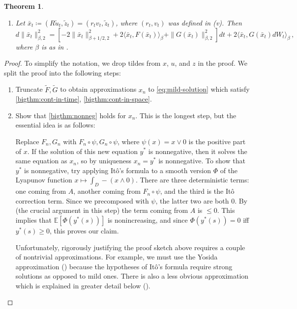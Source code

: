 \documentclass[final]{amsart}
\newtheorem{thm}{Theorem}
\numberwithin{thm}{section}
\numberwithin{equation}{section}
\newcommand{\E}{\mathbb{E}}
\newcommand{\ip}[2]{\langle #1, #2 \rangle}
\begin{document}
\begin{thm}
\begin{enumerate}[label=(\roman*)]
    \item \label{bigthm:dbeta} Let $\bar{x}_t \coloneqq (R\tilde{u}_t, \tilde{z}_t) = (r_tv_t,\tilde{z}_t)$, where $(r_t, v_t)$ was defined in (v). Then
    \begin{equation}\label{eq:dbeta-x-tilde}
        d\|\bar x_t\|_{\beta,2}^2 = [-2\|\bar x_t\|_{\beta+1/2,2}^2 +2\ip{\bar x_t}{F(\bar x_t)}_\beta + \|G(\bar x_t)\|_{\beta,2}^2]dt + 2\ip{\bar x_t}{G(\bar x_t)dW_t}_\beta \,,
    \end{equation}
    where $\beta$ is as in . 
    \end{enumerate}
\end{thm}

\begin{proof}
To simplify the notation, we drop tildes from $x$, $u$, and $z$ in the proof. 
We split the proof into the following steps:



\begin{enumerate}
    \item Truncate $\tilde F, \tilde G$ to obtain approximations $x_n$ to \eqref{eq:mild-solution} which satisfy \ref{bigthm:cont-in-time}, \ref{bigthm:cont-in-space}.
    \item Show that \ref{bigthm:nonneg} holds for $x_n$. This is the longest step, but the essential idea is as follows:
    
    Replace $F_n,G_n$ with $F_n \circ \psi, G_n \circ \psi$, where $\psi(x) = x \vee 0$ is the positive part of $x$. If the solution of this new equation $y^*$ is nonnegative, then it solves the same equation as $x_n$, so by uniqueness $x_n = y^*$ is nonnegative. To show that $y^*$ is nonnegative, try applying It\^{o}'s formula to a smooth version $\Phi$ of the Lyapunov function $x \mapsto \int_D -(x\wedge 0)$. There are three deterministic terms: one coming from $A$, another coming from $F_n \circ \psi$, and the third is the It\^{o} correction term. Since we precomposed with $\psi$, the latter two are both $0$. By  (the crucial argument in this step) the term coming from $A$ is $\leq 0$. This implies that $\E[\Phi(y^*(s))]$ is nonincreasing, and since $\Phi(y^*(s)) = 0$ iff $y^*(s) \geq 0$, this proves our claim.
    
    Unfortunately, rigorously justifying the proof sketch above requires a couple of nontrivial approximations. For example, we must use the Yosida approximation () because the hypotheses of It\^{o}'s formula require strong solutions as opposed to mild ones. There is also a less obvious approximation which is explained in greater detail below ().
    

\end{enumerate}
\end{proof}
\end{document}
